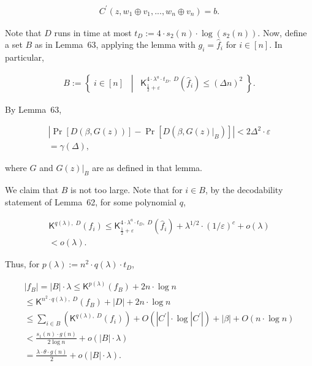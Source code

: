 \[\begin{gathered}
C^{\prime}(z,w_{1}\oplus v_{1},...,w_{n}\oplus v_{n})=b.
\end{gathered}\]


Note that $D$ runs in time at most $t_{D}:=4\cdot s_{2}(n)\cdot\log(s_{2}(n))$. Now, define a set $B$ as in Lemma 63, applying the lemma with $g_{i}=\hat{f}_{i}$ for $i\in[n]$. In particular,\par


\[\begin{gathered}
B:=\left\{\;i\in[n]\;\;\middle|\;\;{\mathsf{K}}^{4\cdot\lambda^{a}\cdot t_{D},\;D}_{\frac{1}{2}+\varepsilon}(\hat{f}_{i})\leq(\Delta n)^{2}\;\right\}.
\end{gathered}\]


By Lemma 63,\par


\[\begin{gathered}
\displaystyle\left|\Pr[D(\beta,G(z))]-\Pr[D(\beta,G(z)|_{B})]\right| \displaystyle<2\Delta^{2}\cdot\varepsilon \\
\displaystyle=\gamma(\Delta),
\end{gathered}\]


where $G$ and $G(z)|_{B}$ are as defined in that lemma.\par




We claim that $B$ is not too large. Note that for $i\in B$, by the decodability statement of Lemma 62, for some polynomial $q$,\par


\[\begin{gathered}
\displaystyle{\mathsf{K}}^{q(\lambda),\;D}(f_{i}) \displaystyle\leq{\mathsf{K}}^{4\cdot\lambda^{a}\cdot t_{D},\;D}_{\frac{1}{2}+\varepsilon}(\hat{f}_{i})+\lambda^{1/2}\cdot(1/\varepsilon)^{c}+o(\lambda) \\
\displaystyle<o(\lambda).
\end{gathered}\]


Thus, for $p(\lambda):=n^{2}\cdot q(\lambda)\cdot t_{D}$,\par


\[\begin{gathered}
\displaystyle|f_{B}|=|B|\cdot\lambda \displaystyle\leq{\mathsf{K}}^{p(\lambda)}(f_{B})+2n\cdot\log n \\
\displaystyle\leq{\mathsf{K}}^{n^{2}\cdot q(\lambda),\;D}(f_{B})+|D|+2n\cdot\log
n \\
\displaystyle\leq\sum_{i\in B}\left({\mathsf{K}}^{q(\lambda),\;D}(f_{i})\right)+O(|C^{\prime}|\cdot\log|C^{\prime}|)+|\beta|+O(n\cdot\log n) \\
\displaystyle<\frac{s_{1}(n)\cdot g(n)}{2\log n}+o(|B|\cdot\lambda) \\
\displaystyle=\frac{\lambda\cdot\theta\cdot g(n)}{2}+o(|B|\cdot\lambda).
\end{gathered}\]


